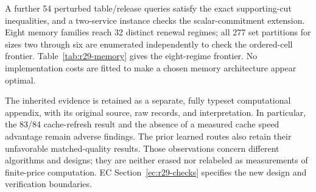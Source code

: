 A further 54 perturbed table/release queries satisfy the exact supporting-cut inequalities, and a two-service instance checks the scalar-commitment extension. Eight memory families reach 32 distinct renewal regimes; all 277 set partitions for sizes two through six are enumerated independently to check the ordered-cell frontier. Table~\ref{tab:r29-memory} gives the eight-regime frontier. No implementation costs are fitted to make a chosen memory architecture appear optimal.

The inherited evidence is retained as a separate, fully typeset computational appendix, with its original source, raw records, and interpretation. In particular, the 83/84 cache-refresh result and the absence of a measured cache speed advantage remain adverse findings. The prior learned routes also retain their unfavorable matched-quality results. Those observations concern different algorithms and designs; they are neither erased nor relabeled as measurements of finite-price computation. EC Section~\ref{ec:r29-checks} specifies the new design and verification boundaries.

